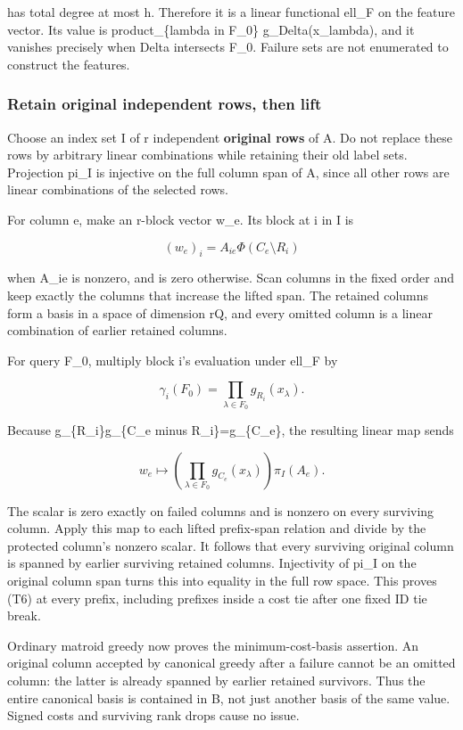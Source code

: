 has total degree at most h. Therefore it is a linear functional ell\_F on the feature vector. Its value is product\_\{lambda in F\_0\} g\_Delta(x\_lambda), and it vanishes precisely when Delta intersects F\_0. Failure sets are not enumerated to construct the features.

\hypertarget{af-3f6acd6e5b-retain-original-independent-rows-then-lift}{%
\subsubsection{Retain original independent rows, then lift}\label{af-3f6acd6e5b-retain-original-independent-rows-then-lift}}

Choose an index set I of r independent \textbf{original rows} of A. Do not replace these rows by arbitrary linear combinations while retaining their old label sets. Projection pi\_I is injective on the full column span of A, since all other rows are linear combinations of the selected rows.

For column e, make an r-block vector w\_e. Its block at i in I is

\[
(w_e)_i=A_{ie}\Phi(C_e\setminus R_i)
 \tag{T10}
\]

when A\_ie is nonzero, and is zero otherwise. Scan columns in the fixed order and keep exactly the columns that increase the lifted span. The retained columns form a basis in a space of dimension rQ, and every omitted column is a linear combination of earlier retained columns.

For query F\_0, multiply block i's evaluation under ell\_F by

\[
\gamma_i(F_0)=\prod_{\lambda\in F_0}g_{R_i}(x_\lambda).
 \tag{T11}
\]

Because g\_\{R\_i\}g\_\{C\_e minus R\_i\}=g\_\{C\_e\}, the resulting linear map sends

\[
w_e\longmapsto
       \left(\prod_{\lambda\in F_0}g_{C_e}(x_\lambda)\right)\pi_I(A_e).
 \tag{T12}
\]

The scalar is zero exactly on failed columns and is nonzero on every surviving column. Apply this map to each lifted prefix-span relation and divide by the protected column's nonzero scalar. It follows that every surviving original column is spanned by earlier surviving retained columns. Injectivity of pi\_I on the original column span turns this into equality in the full row space. This proves (T6) at every prefix, including prefixes inside a cost tie after one fixed ID tie break.

Ordinary matroid greedy now proves the minimum-cost-basis assertion. An original column accepted by canonical greedy after a failure cannot be an omitted column: the latter is already spanned by earlier retained survivors. Thus the entire canonical basis is contained in B, not just another basis of the same value. Signed costs and surviving rank drops cause no issue.

